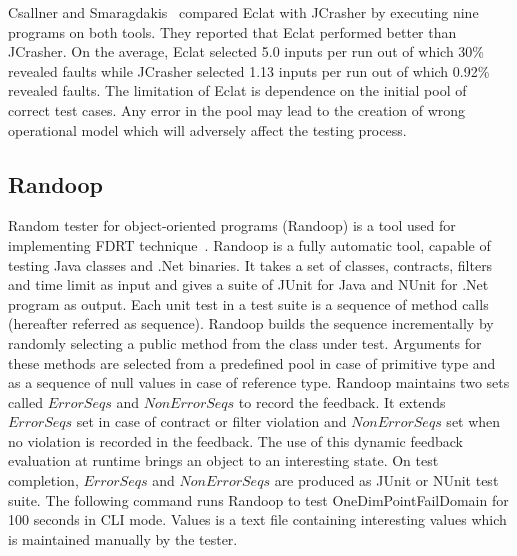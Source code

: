 Csallner and Smaragdakis~\cite{csallner2004jcrasher} compared Eclat with JCrasher by executing nine programs on  both tools. They reported that Eclat performed better than JCrasher. On the average, Eclat selected 5.0 inputs per run out of which 30\% revealed faults while JCrasher selected 1.13 inputs per run out of which 0.92\% revealed faults. The limitation of Eclat is dependence on the initial pool of correct test cases. Any error in the pool may lead to the creation of wrong operational model which will adversely affect the testing process.   



\subsection{Randoop}
Random tester for object-oriented programs (Randoop) is a tool used for implementing FDRT technique~\cite{pacheco2007randoop}. Randoop is a fully automatic tool, capable of testing Java classes and .Net binaries. It takes a set of classes, contracts, filters and time limit as input and gives a suite of JUnit for Java and NUnit for .Net program as output. Each unit test in a test suite is a sequence of method calls (hereafter referred as sequence). Randoop builds the sequence incrementally by randomly selecting a public method from the class under test.  Arguments for these methods are selected from a predefined pool in case of primitive type and as a sequence of null values in case of reference type. Randoop maintains two sets called $ErrorSeqs$ and $NonErrorSeqs$ to record the feedback. It extends $ErrorSeqs$ set in case of contract or filter violation and $NonErrorSeqs$ set when no violation is recorded in the feedback. The use of this dynamic feedback evaluation at runtime brings an object to an interesting state. On test completion, $ErrorSeqs$ and $NonErrorSeqs$ are produced as JUnit or NUnit test suite. The following command runs Randoop to test OneDimPointFailDomain for 100 seconds in CLI mode. Values is a text file containing interesting values which is maintained manually by the tester.
\bigskip

